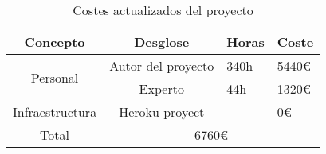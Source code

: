 \begin{longtable}{|c|c|l|l|}
  \caption{Costes actualizados del proyecto}
  \label{tab:costes actualizados del proyecto}

  \endfirsthead
  \endhead

  \hline
  Concepto & Desglose & Horas & Coste \\ \hline
  \multirow{2}{*}{Personal} & Autor del proyecto & 340h & 5440€ \\ \cline{2-4}
  & Experto & 44h & 1320€ \\ \hline
  Infraestructura & Heroku proyect & - & 0€ \\ \hline
  Total & \multicolumn{3}{c|}{6760€} \\ \hline

\end{longtable}
